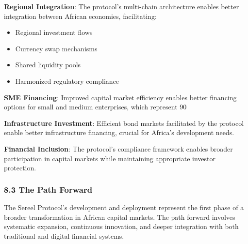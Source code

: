 \documentclass[12pt]{article}
\begin{document}
\textbf{Regional Integration}: The protocol's multi-chain architecture enables better integration between African economies, facilitating:
\begin{itemize}
	\item Regional investment flows
	\item Currency swap mechanisms
	\item Shared liquidity pools
	\item Harmonized regulatory compliance

\end{itemize}

\textbf{SME Financing}: Improved capital market efficiency enables better financing options for small and medium enterprises, which represent 90%

\textbf{Infrastructure Investment}: Efficient bond markets facilitated by the protocol enable better infrastructure financing, crucial for Africa's development needs.

\textbf{Financial Inclusion}: The protocol's compliance framework enables broader participation in capital markets while maintaining appropriate investor protection.

\subsubsection{8.3 The Path Forward} %

The Sereel Protocol's development and deployment represent the first phase of a broader transformation in African capital markets. The path forward involves systematic expansion, continuous innovation, and deeper integration with both traditional and digital financial systems.

\end{document}
